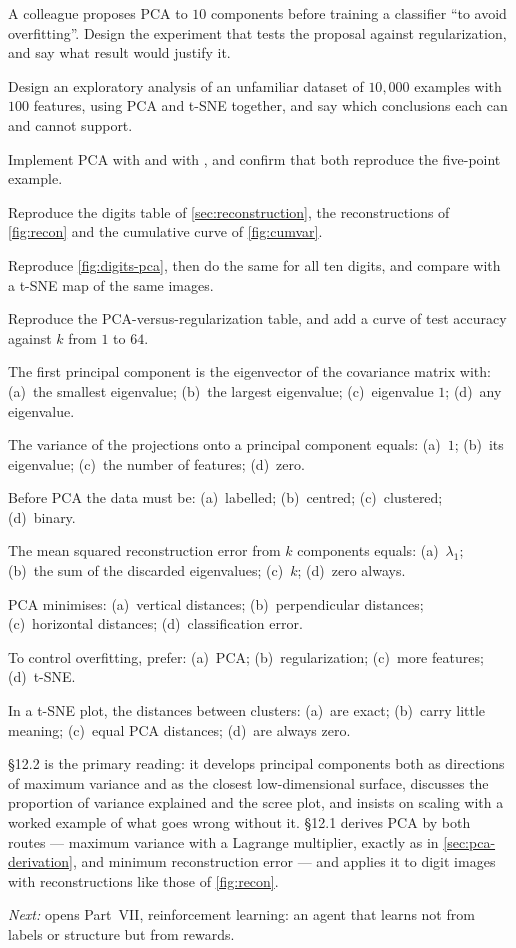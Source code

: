 \dpr A colleague proposes PCA to $10$ components before training a classifier
``to avoid overfitting''. Design the experiment that tests the proposal against
regularization, and say what result would justify it.

\dpr Design an exploratory analysis of an unfamiliar dataset of $10{,}000$ examples
with $100$ features, using PCA and t-SNE together, and say which conclusions each
can and cannot support.


\pe Implement PCA with  and with , and
confirm that both reproduce the five-point example.

\pe Reproduce the digits table of \cref{sec:reconstruction}, the reconstructions of
\cref{fig:recon} and the cumulative curve of \cref{fig:cumvar}.

\pe Reproduce \cref{fig:digits-pca}, then do the same for all ten digits, and
compare with a t-SNE map of the same images.

\pe Reproduce the PCA-versus-regularization table, and add a curve of test accuracy
against $k$ from $1$ to $64$.


\qz The first principal component is the eigenvector of the covariance matrix
with: (a)~the smallest eigenvalue; (b)~the largest eigenvalue; (c)~eigenvalue $1$;
(d)~any eigenvalue.

\qz The variance of the projections onto a principal component equals:
(a)~$1$; (b)~its eigenvalue; (c)~the number of features; (d)~zero.

\qz Before PCA the data must be: (a)~labelled; (b)~centred; (c)~clustered;
(d)~binary.

\qz The mean squared reconstruction error from $k$ components equals:
(a)~$\lambda_1$; (b)~the sum of the discarded eigenvalues; (c)~$k$;
(d)~zero always.

\qz PCA minimises: (a)~vertical distances; (b)~perpendicular distances;
(c)~horizontal distances; (d)~classification error.

\qz To control overfitting, prefer: (a)~PCA; (b)~regularization;
(c)~more features; (d)~t-SNE.

\qz In a t-SNE plot, the distances between clusters: (a)~are exact; (b)~carry
little meaning; (c)~equal PCA distances; (d)~are always zero.

\furtherreading

\textcite{james2021} §12.2 is the primary reading: it develops principal components
both as directions of maximum variance and as the closest low-dimensional surface,
discusses the proportion of variance explained and the scree plot, and insists on
scaling with a worked example of what goes wrong without it. \textcite{bishop2006}
§12.1 derives PCA by both routes --- maximum variance with a Lagrange multiplier,
exactly as in \cref{sec:pca-derivation}, and minimum reconstruction error --- and
applies it to digit images with reconstructions like those of \cref{fig:recon}.

\bigskip
\noindent\emph{Next:}  opens Part~VII, reinforcement learning: an
agent that learns not from labels or structure but from rewards.
